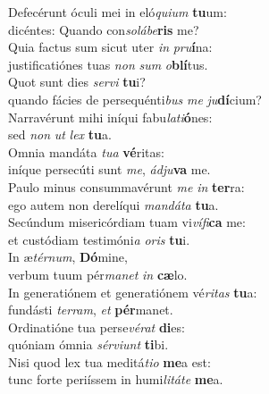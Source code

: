 \evenverse Defecérunt óculi mei in eló\textit{qui}\textit{um} \textbf{tu}um:~\*\\
\evenverse dicéntes: Quando con\textit{so}\textit{lá}\textit{be}\textbf{ris} me?\\
\oddverse Quia factus sum sicut uter \textit{in} \textit{pru}\textbf{í}na:~\*\\
\oddverse justificatiónes tuas \textit{non} \textit{sum} \textit{o}\textbf{blí}tus.\\
\evenverse Quot sunt dies \textit{ser}\textit{vi} \textbf{tu}i?~\*\\
\evenverse quando fácies de persequénti\textit{bus} \textit{me} \textit{ju}\textbf{dí}cium?\\
\oddverse Narravérunt mihi iníqui fabu\textit{la}\textit{ti}\textbf{ó}nes:~\*\\
\oddverse sed \textit{non} \textit{ut} \textit{lex} \textbf{tu}a.\\
\evenverse Omnia mandáta \textit{tu}\textit{a} \textbf{vé}ritas:~\*\\
\evenverse iníque persecúti sunt \textit{me}, \textit{ád}\textit{ju}\textbf{va} me.\\
\oddverse Paulo minus consummavérunt \textit{me} \textit{in} \textbf{ter}ra:~\*\\
\oddverse ego autem non derelíqui \textit{man}\textit{dá}\textit{ta} \textbf{tu}a.\\
\evenverse Secúndum misericórdiam tuam vi\textit{ví}\textit{fi}\textbf{ca} me:~\*\\
\evenverse et custódiam testimóni\textit{a} \textit{o}\textit{ris} \textbf{tu}i.\\
\oddverse In æ\textit{tér}\textit{num}, \textbf{Dó}mine,~\*\\
\oddverse verbum tuum pér\textit{ma}\textit{net} \textit{in} \textbf{cæ}lo.\\
\evenverse In generatiónem et generatiónem vé\textit{ri}\textit{tas} \textbf{tu}a:~\*\\
\evenverse fundásti \textit{ter}\textit{ram}, \textit{et} \textbf{pér}manet.\\
\oddverse Ordinatióne tua perse\textit{vé}\textit{rat} \textbf{di}es:~\*\\
\oddverse quóniam ómnia \textit{sér}\textit{vi}\textit{unt} \textbf{ti}bi.\\
\evenverse Nisi quod lex tua meditá\textit{ti}\textit{o} \textbf{me}a est:~\*\\
\evenverse tunc forte periíssem in humi\textit{li}\textit{tá}\textit{te} \textbf{me}a.\\
